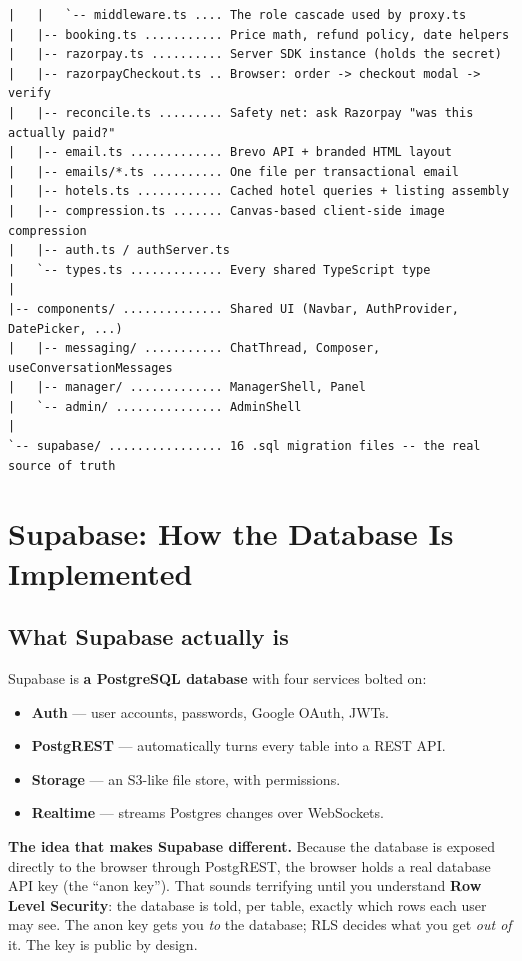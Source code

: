 \documentclass[11pt,a4paper]{article}
\begin{document}
\begin{lstlisting}
|   |   `-- middleware.ts .... The role cascade used by proxy.ts
|   |-- booking.ts ........... Price math, refund policy, date helpers
|   |-- razorpay.ts .......... Server SDK instance (holds the secret)
|   |-- razorpayCheckout.ts .. Browser: order -> checkout modal -> verify
|   |-- reconcile.ts ......... Safety net: ask Razorpay "was this actually paid?"
|   |-- email.ts ............. Brevo API + branded HTML layout
|   |-- emails/*.ts .......... One file per transactional email
|   |-- hotels.ts ............ Cached hotel queries + listing assembly
|   |-- compression.ts ....... Canvas-based client-side image compression
|   |-- auth.ts / authServer.ts
|   `-- types.ts ............. Every shared TypeScript type
|
|-- components/ .............. Shared UI (Navbar, AuthProvider, DatePicker, ...)
|   |-- messaging/ ........... ChatThread, Composer, useConversationMessages
|   |-- manager/ ............. ManagerShell, Panel
|   `-- admin/ ............... AdminShell
|
`-- supabase/ ................ 16 .sql migration files -- the real source of truth
\end{lstlisting}

\newpage
\section{Supabase: How the Database Is Implemented}

\subsection{What Supabase actually is}

Supabase is \textbf{a PostgreSQL database} with four services bolted on:

\begin{itemize}[leftmargin=*,noitemsep]
  \item \textbf{Auth} --- user accounts, passwords, Google OAuth, JWTs.
  \item \textbf{PostgREST} --- automatically turns every table into a REST API.
  \item \textbf{Storage} --- an S3-like file store, with permissions.
  \item \textbf{Realtime} --- streams Postgres changes over WebSockets.
\end{itemize}

\begin{notebox}
\textbf{The idea that makes Supabase different.} Because the database is exposed
directly to the browser through PostgREST, the browser holds a real database
API key (the ``anon key''). That sounds terrifying until you understand
\textbf{Row Level Security}: the database is told, per table, exactly which rows
each user may see. The anon key gets you \emph{to} the database; RLS decides what
you get \emph{out of} it. The key is public by design.
\end{notebox}
\end{document}
